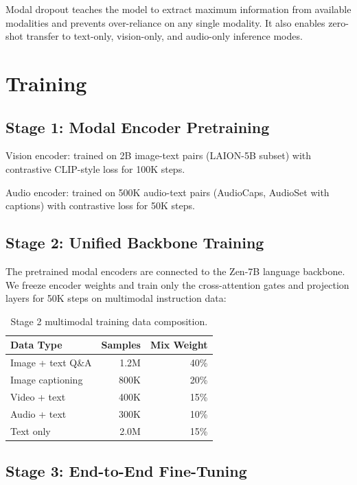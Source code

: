 \documentclass[11pt,a4paper]{article}
\begin{document}
Modal dropout teaches the model to extract maximum information from available
modalities and prevents over-reliance on any single modality. It also enables
zero-shot transfer to text-only, vision-only, and audio-only inference modes.

\section{Training}

\subsection{Stage 1: Modal Encoder Pretraining}

Vision encoder: trained on 2B image-text pairs (LAION-5B subset) with contrastive
CLIP-style loss for 100K steps.

Audio encoder: trained on 500K audio-text pairs (AudioCaps, AudioSet with captions)
with contrastive loss for 50K steps.

\subsection{Stage 2: Unified Backbone Training}

The pretrained modal encoders are connected to the Zen-7B language backbone. We
freeze encoder weights and train only the cross-attention gates and projection layers
for 50K steps on multimodal instruction data:

\begin{table}[H]
\centering
\begin{tabular}{lrr}
\toprule
\textbf{Data Type} & \textbf{Samples} & \textbf{Mix Weight} \\
\midrule
Image + text Q\&A & 1.2M & 40\% \\
Image captioning & 800K & 20\% \\
Video + text & 400K & 15\% \\
Audio + text & 300K & 10\% \\
Text only & 2.0M & 15\% \\
\bottomrule
\end{tabular}
\caption{Stage 2 multimodal training data composition.}
\end{table}

\subsection{Stage 3: End-to-End Fine-Tuning}
\end{document}
